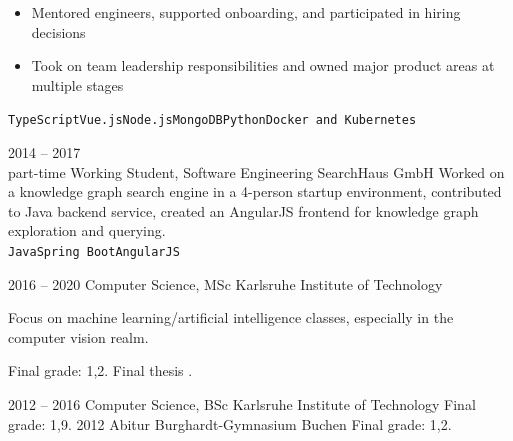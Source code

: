 \documentclass[8pt]{developercv} %
\newcommand{\linebreaksmall}{\vspace{2mm}}
\begin{document}
\begin{entrylist}
{\begin{itemize}[nosep, topsep=0pt, left=5pt, after=\vspace{6pt}]
			\item Mentored engineers, supported onboarding, and participated in hiring decisions
			\item Took on team leadership responsibilities and owned major product areas at multiple stages
		\end{itemize}
		 \texttt{TypeScript}\slashsep\texttt{Vue.js}\slashsep\texttt{Node.js}\slashsep\texttt{MongoDB}\slashsep\texttt{Python}\slashsep\texttt{Docker and Kubernetes}} \linebreaksmall
	\entry
		{2014 -- 2017\\\footnotesize{part-time}}
		{Working Student, Software Engineering}
		{SearchHaus GmbH}
		{Worked on a knowledge graph search engine in a 4-person startup environment, contributed to Java backend service, created an AngularJS frontend for knowledge graph exploration and querying.
		\linebreaksmall \\ \texttt{Java}\slashsep\texttt{Spring Boot}\slashsep\texttt{AngularJS}}
\end{entrylist}



\begin{entrylist}
	\entry
		{2016 -- 2020}
		{Computer Science, MSc}
		{Karlsruhe Institute of Technology}
		{Focus on machine learning/artificial intelligence classes, especially in the computer vision realm.
		
		Final grade: 1,2. Final thesis .}
	\entry
		{2012 -- 2016}
		{Computer Science, BSc}
		{Karlsruhe Institute of Technology}
		{Final grade: 1,9.}
	\entry
		{2012}
		{Abitur}
		{Burghardt-Gymnasium Buchen}
		{Final grade: 1,2.}
\end{entrylist}

\end{document}
